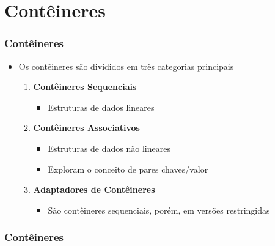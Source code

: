 \documentclass[xcolor={dvipsnames,table},aspectratio=169]{beamer}
\begin{document}
\section{Contêineres}

\begin{frame}\frametitle{Contêineres}
\begin{itemize}
	\item Os contêineres são divididos em três categorias principais
	\begin{enumerate}
		\item \textbf{Contêineres Sequenciais}
		\begin{itemize}
			\item Estruturas de dados lineares
		\end{itemize}
		\item \textbf{Contêineres Associativos}
		\begin{itemize}
			\item Estruturas de dados não lineares
			\item Exploram o conceito de pares chaves/valor
		\end{itemize}
		\item \textbf{Adaptadores de Contêineres}
		\begin{itemize}
			\item São contêineres sequenciais, porém, em versões restringidas
		\end{itemize}
	\end{enumerate}
\end{itemize}
\end{frame}

\begin{frame}\frametitle{Contêineres}
\begin{center}
\end{center}
\end{frame}
\end{document}
